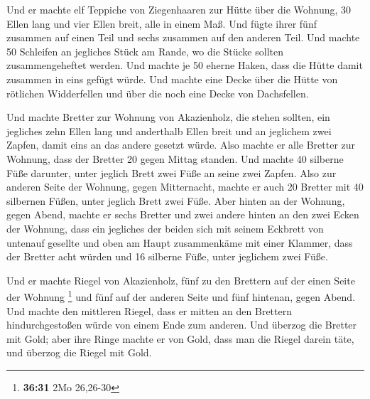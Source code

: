  Und er machte elf Teppiche von Ziegenhaaren zur Hütte über
die Wohnung,  30 Ellen lang und vier Ellen breit, alle in
einem Maß.  Und fügte ihrer fünf zusammen auf einen Teil
und sechs zusammen auf den anderen Teil.  Und machte 50
Schleifen an jegliches Stück am Rande, wo die Stücke sollten
zusammengeheftet werden.  Und machte je 50 eherne Haken,
dass die Hütte damit zusammen in eins gefügt würde.  Und
machte eine Decke über die Hütte von rötlichen Widderfellen und über die
noch eine Decke von Dachsfellen.

 Und machte Bretter zur Wohnung von Akazienholz, die stehen
sollten,  ein jegliches zehn Ellen lang und anderthalb
Ellen breit  und an jeglichem zwei Zapfen, damit eins an
das andere gesetzt würde. Also machte er alle Bretter zur Wohnung,
 dass der Bretter 20 gegen Mittag standen. 
Und machte 40 silberne Füße darunter, unter jeglich Brett zwei Füße an
seine zwei Zapfen.  Also zur anderen Seite der Wohnung,
gegen Mitternacht, machte er auch 20 Bretter  mit 40
silbernen Füßen, unter jeglich Brett zwei Füße.  Aber
hinten an der Wohnung, gegen Abend, machte er sechs Bretter
 und zwei andere hinten an den zwei Ecken der Wohnung,
 dass ein jegliches der beiden sich mit seinem Eckbrett von
untenauf gesellte und oben am Haupt zusammenkäme mit einer Klammer,
 dass der Bretter acht würden und 16 silberne Füße, unter
jeglichem zwei Füße.

 Und er machte Riegel von Akazienholz, fünf zu den Brettern
auf der einen Seite der Wohnung \footnote{\textbf{36:31} 2Mo 26,26-30}
 und fünf auf der anderen Seite und fünf hintenan, gegen
Abend.  Und machte den mittleren Riegel, dass er mitten an
den Brettern hindurchgestoßen würde von einem Ende zum anderen.
 Und überzog die Bretter mit Gold; aber ihre Ringe machte
er von Gold, dass man die Riegel darein täte, und überzog die Riegel mit
Gold.

